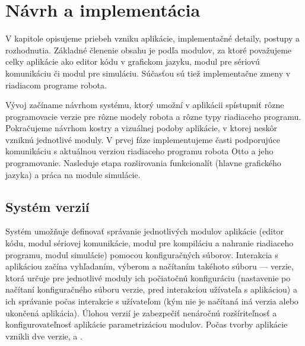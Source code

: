 
\chapter{Návrh a implementácia}
\label{kap:implementacia}

V kapitole opisujeme priebeh vzniku aplikácie, implementačné detaily, postupy a rozhodnutia. Základné členenie obsahu je podľa modulov, za ktoré považujeme celky aplikácie ako editor kódu v grafickom jazyku, modul pre sériovú komunikáciu či modul pre simuláciu. Súčasťou sú tiež implementačne zmeny v riadiacom programe robota.

Vývoj začíname návrhom systému, ktorý umožní v aplikácii spístupniť rôzne programovacie verzie pre rôzne modely robota a rôzne typy riadiaceho programu. Pokračujeme návrhom kostry a vizuálnej podoby aplikácie, v ktorej neskôr vzniknú jednotlivé moduly. V prvej fáze implementujeme časti podporujúce komunikáciu s aktuálnou verziou riadiaceho programu robota Otto a jeho programovanie. Nasleduje etapa rozširovania funkcionalít (hlavne grafického jazyka)  a práca na module simulácie.




\section{Systém verzií}
Systém umožňuje definovať správanie jednotlivých modulov aplikácie (editor kódu, modul sériovej komunikácie, modul pre kompiláciu a nahranie riadiaceho programu, modul simulácie) pomocou konfiguračných súborov. Interakcia s aplikáciou začína vyhľadaním, výberom a načítaním takéhoto súboru --- verzie, ktorá určuje pre jednotlivé moduly ich počiatočnú konfiguráciu (nastavenie po načítaní konfiguračného súboru verzie, pred interakciou užívateľa s aplikáciou) a ich správanie počas interakcie s užívateľom (kým nie je načítaná iná verzia alebo ukončená aplikácia). Úlohou verzií je zabezpečiť nenáročnú rozšíriteľnosť a konfigurovateľnosť aplikácie parametrizáciou modulov. Počas tvorby aplikácie vznikli dve verzie,  a .

